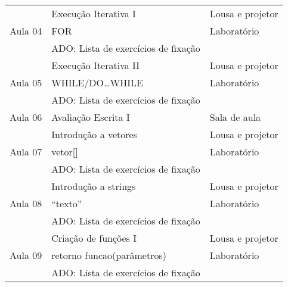 \documentclass[a4paper]{article}
\begin{document}
\begin{longtable}{lll}
            \multirow{3}{*}{Aula 04} & Execução Iterativa I                            & Lousa e projetor \\ \cmidrule{2-3}
                                     & FOR                                             & Laboratório      \\ \cmidrule{2-3}
                                     & ADO: Lista de exercícios de fixação                                \\ \midrule

            \multirow{3}{*}{Aula 05} & Execução Iterativa II                           & Lousa e projetor \\ \cmidrule{2-3}
                                     & WHILE/DO\ldots{}WHILE                           & Laboratório      \\ \cmidrule{2-3}
                                     & ADO: Lista de exercícios de fixação                                \\ \midrule

            Aula 06                  & Avaliação Escrita I                             & Sala de aula     \\ \midrule

            \multirow{3}{*}{Aula 07} & Introdução a vetores                            & Lousa e projetor \\ \cmidrule{2-3}
                                     & vetor[]                                         & Laboratório      \\ \cmidrule{2-3}
                                     & ADO: Lista de exercícios de fixação                                \\ \midrule

            \multirow{3}{*}{Aula 08} & Introdução a strings                            & Lousa e projetor \\ \cmidrule{2-3}
                                     & ``texto''                                       & Laboratório      \\ \cmidrule{2-3}
                                     & ADO: Lista de exercícios de fixação                                \\ \midrule

            \multirow{3}{*}{Aula 09} & Criação de funções I                            & Lousa e projetor \\ \cmidrule{2-3}
                                     & retorno funcao(parâmetros)                      & Laboratório      \\ \cmidrule{2-3}
                                     & ADO: Lista de exercícios de fixação                                \\ \midrule


\end{longtable}
\end{document}
